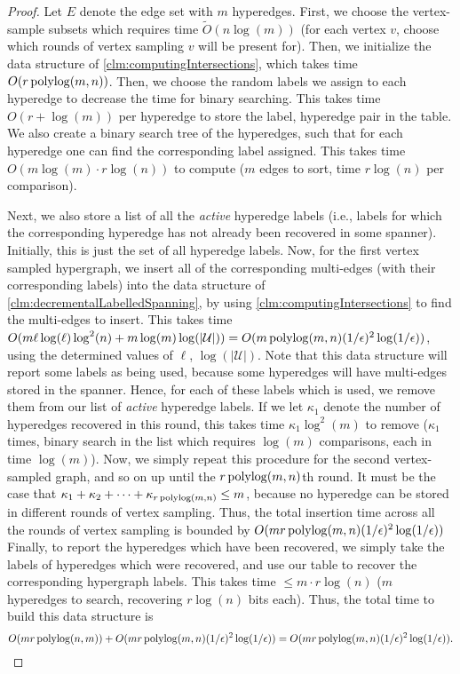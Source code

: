\documentclass{article}
\begin{document}
\begin{proof}
    Let $E$ denote the edge set with $m$ hyperedges. First, we choose the vertex-sample subsets which requires time $\widetilde{O}(n\log(m))$ (for each vertex $v$, choose which rounds of vertex sampling $v$ will be present for). Then, we initialize the data structure of \cref{clm:computingIntersections}, which takes time $O(r \operatorname{polylog}(m,n))$. Then, we choose the random labels we assign to each hyperedge to decrease the time for binary searching. This takes time $O(r +  \log(m))$ per hyperedge to store the label, hyperedge pair in the table. We also create a binary search tree of the hyperedges, such that for each hyperedge one can find the corresponding label assigned. This takes time $O(m \log(m) \cdot r \log(n))$ to compute ($m$ edges to sort, time $r \log(n)$ per comparison). 

    Next, we also store a list of all the \emph{active} hyperedge labels (i.e., labels for which the corresponding hyperedge has not already been recovered in some spanner). Initially, this is just the set of all hyperedge labels. Now, for the first vertex sampled hypergraph, we insert all of the corresponding multi-edges (with their corresponding labels) into the data structure of \cref{clm:decrementalLabelledSpanning}, by using \cref{clm:computingIntersections} to find the multi-edges to insert. This takes time $O(m \ell \log(\ell) \log^2(n) + m \log(m) \log(|\mathcal{U}|)) = O(m \operatorname{polylog}(m,n)(1/\epsilon)^2\log(1/\epsilon))$, using the determined values of $\ell$, $\log(|\mathcal{U}|)$. Note that this data structure will report some labels as being used, because some hyperedges will have multi-edges stored in the spanner. Hence, for each of these labels which is used, we remove them from our list of \emph{active} hyperedge labels. If we let $\kappa_1$ denote the number of hyperedges recovered in this round, this takes time $\kappa_1 \log^2(m)$ to remove ($\kappa_1$ times, binary search in the list which requires $\log(m)$ comparisons, each in time $\log(m)$). Now, we simply repeat this procedure for the second vertex-sampled graph, and so on up until the $r\operatorname{polylog}(m,n)$th round. It must be the case that $\kappa_1 + \kappa_2 + \dots + \kappa_{r\operatorname{polylog}(m,n)} \leq m$, because no hyperedge can be stored in different rounds of vertex sampling. Thus, the total insertion time across all the rounds of vertex sampling is bounded by $O(m r \operatorname{polylog}(m,n) (1/\epsilon)^2\log(1/\epsilon))$ Finally, to report the hyperedges which have been recovered, we simply take the labels of hyperedges which were recovered, and use our table to recover the corresponding hypergraph labels. This takes time $\leq m \cdot r\log(n)$ ($m$ hyperedges to search, recovering $r \log(n)$ bits each). Thus, the total time to build this data structure is 
    \[
    O(mr \operatorname{polylog}(n,m)) + O(m r \operatorname{polylog}(m,n) (1/\epsilon)^2\log(1/\epsilon))  =  O(m r \operatorname{polylog}(m,n) (1/\epsilon)^2\log(1/\epsilon)).
    \]
\end{proof}
\end{document}
